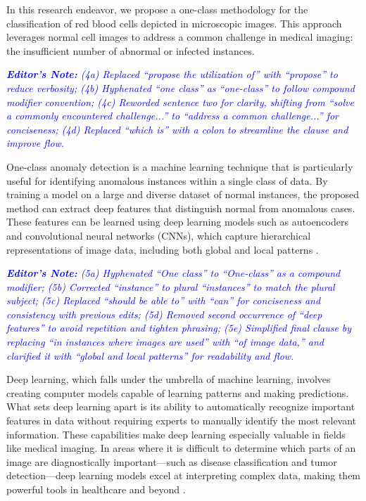 \documentclass[journal,12pt,onecolumn,draftcls]{IEEEtran}
\newcommand{\editornote}[1]{\par\textit{\textcolor{blue}{\textbf{Editor's Note:} #1}}\par}
\begin{document}
In this research endeavor, we propose a one-class methodology for the classification of red blood cells depicted in microscopic images. This approach leverages normal cell images to address a common challenge in medical imaging: the insufficient number of abnormal or infected instances.

\editornote{(4a) Replaced “propose the utilization of” with “propose” to reduce verbosity; 
(4b) Hyphenated “one class” as “one-class” to follow compound modifier convention; 
(4c) Reworded sentence two for clarity, shifting from “solve a commonly encountered challenge...” to “address a common challenge...” for conciseness; 
(4d) Replaced “which is” with a colon to streamline the clause and improve flow.}

One-class anomaly detection is a machine learning technique that is particularly useful for identifying anomalous instances within a single class of data. By training a model on a large and diverse dataset of normal instances, the proposed method can extract deep features that distinguish normal from anomalous cases. These features can be learned using deep learning models such as autoencoders and convolutional neural networks (CNNs), which capture hierarchical representations of image data, including both global and local patterns \cite{torres2021}.

\editornote{(5a) Hyphenated “One class” to “One-class” as a compound modifier; 
(5b) Corrected “instance” to plural “instances” to match the plural subject; 
(5c) Replaced “should be able to” with “can” for conciseness and consistency with previous edits; 
(5d) Removed second occurrence of “deep features” to avoid repetition and tighten phrasing; 
(5e) Simplified final clause by replacing “in instances where images are used” with “of image data,” and clarified it with “global and local patterns” for readability and flow.}

Deep learning, which falls under the umbrella of machine learning, involves creating computer models capable of learning patterns and making predictions. What sets deep learning apart is its ability to automatically recognize important features in data without requiring experts to manually identify the most relevant information. These capabilities make deep learning especially valuable in fields like medical imaging. In areas where it is difficult to determine which parts of an image are diagnostically important—such as disease classification and tumor detection—deep learning models excel at interpreting complex data, making them powerful tools in healthcare and beyond \cite{torres2021}.
\end{document}

